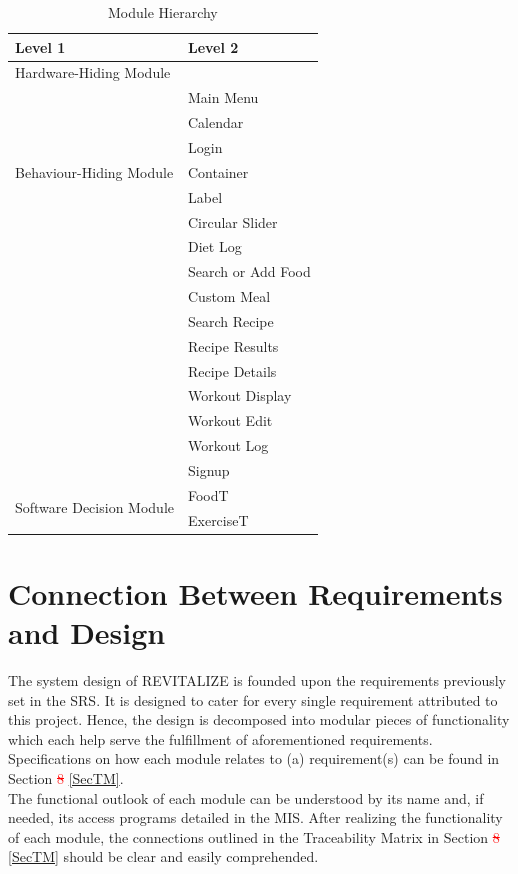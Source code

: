 \documentclass[12pt, titlepage]{article}
\begin{document}
\begin{table}[h!]
	\centering
	\begin{tabular}{p{} p{}}
		\toprule
		\textbf{Level 1} & \textbf{Level 2}\\
		\midrule
		
		{Hardware-Hiding Module} & ~ \\
		\midrule
		
		\multirow{7}{0.3\textwidth}{Behaviour-Hiding Module} & Main Menu\\
		& Calendar\\
		& Login\\
		& Container\\
		& Label\\
		& Circular Slider\\
		& Diet Log\\ 
		& Search or Add Food\\
		& Custom Meal\\
		& Search Recipe\\
		& Recipe Results\\
		& Recipe Details\\
		& Workout Display\\
		& Workout Edit\\
		& Workout Log\\
		& Signup\\
		\midrule
		
		\multirow{3}{0.3\textwidth}{Software Decision Module} & FoodT\\
		& ExerciseT\\
		\bottomrule
		
	\end{tabular}
	\caption{Module Hierarchy}
	\label{TblMH}
\end{table}

\section{Connection Between Requirements and Design} \label{SecConnection}

The system design of REVITALIZE is founded upon the requirements previously set in the SRS. It is designed to cater for every single requirement attributed to this project. Hence, the design is decomposed into modular pieces of functionality which each help serve the fulfillment of aforementioned requirements. Specifications on how each module relates to (a) requirement(s) can be found in Section \textcolor{red}{\sout{8}} \textcolor{red}{\ref{SecTM}}.\\
The functional outlook of each module can be understood by its name and, if needed, its access programs detailed in the MIS. After realizing the functionality of each module, the connections outlined in the Traceability Matrix in Section \textcolor{red}{\sout{8}} \textcolor{red}{\ref{SecTM}} should be clear and easily comprehended.
\end{document}
